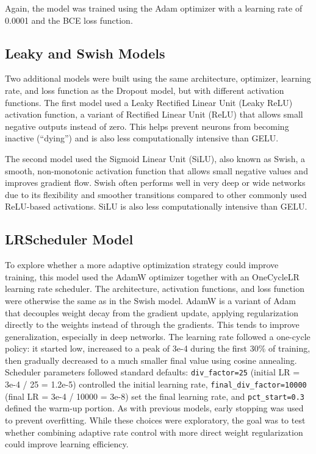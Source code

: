 \documentclass{article}      %
\begin{document}
Again, the model was trained using the Adam optimizer with a learning rate of 0.0001 and the BCE loss function.

\subsection{Leaky and Swish Models}

Two additional models were built using the same architecture, optimizer, learning rate, and loss function as the Dropout model, but with different activation functions. The first model used a Leaky Rectified Linear Unit (Leaky ReLU) activation function, a variant of Rectified Linear Unit (ReLU) that allows small negative outputs instead of zero. This helps prevent neurons from becoming inactive (“dying”) and is also less computationally intensive than GELU.

The second model used the Sigmoid Linear Unit (SiLU), also known as Swish, a smooth, non-monotonic activation function that allows small negative values and improves gradient flow. Swish often performs well in very deep or wide networks due to its flexibility and smoother transitions compared to other commonly used ReLU-based activations. SiLU is also less computationally intensive than GELU.

\subsection{LRScheduler Model}

To explore whether a more adaptive optimization strategy could improve training, this model used the AdamW optimizer together with an OneCycleLR learning rate scheduler. The architecture, activation functions, and loss function were otherwise the same as in the Swish model. AdamW is a variant of Adam that decouples weight decay from the gradient update, applying regularization directly to the weights instead of through the gradients. This tends to improve generalization, especially in deep networks. The learning rate followed a one-cycle policy: it started low, increased to a peak of 3e-4 during the first 30\% of training, then gradually decreased to a much smaller final value using cosine annealing. Scheduler parameters followed standard defaults: \texttt{div\_factor=25} (initial LR = 3e-4 / 25 = 1.2e-5) controlled the initial learning rate, \texttt{final\_div\_factor=10000} (final LR = 3e-4 / 10000 = 3e-8) set the final learning rate, and \texttt{pct\_start=0.3} defined the warm-up portion. As with previous models, early stopping was used to prevent overfitting. While these choices were exploratory, the goal was to test whether combining adaptive rate control with more direct weight regularization could improve learning efficiency.
\end{document}
